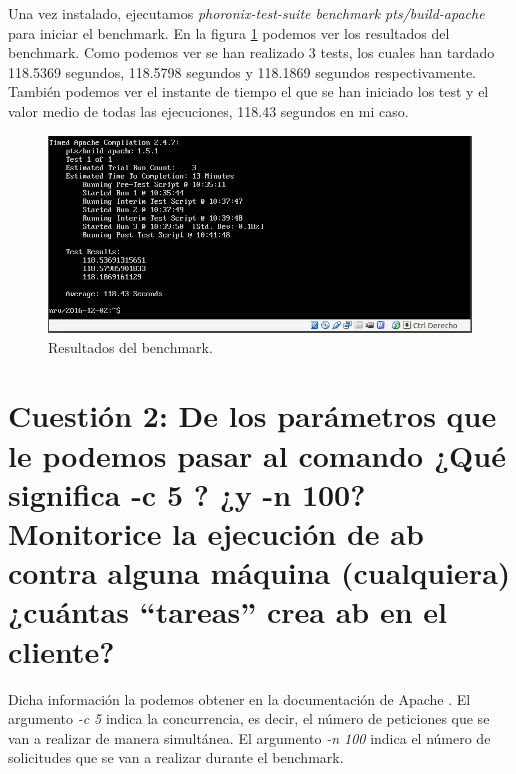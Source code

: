 \documentclass[a4paper,titlepage,12pt]{scrartcl}	%
\numberwithin{figure}{section} %
\numberwithin{table}{section} %
\begin{document}
	Una vez instalado, ejecutamos \textit{phoronix-test-suite benchmark pts/build-apache} para iniciar el benchmark. En la figura \ref{1-5} podemos ver los resultados del benchmark. Como podemos ver se han realizado 3 tests, los cuales han tardado 118.5369 segundos, 118.5798 segundos y 118.1869 segundos respectivamente. También podemos ver el instante de tiempo el que se han iniciado los test y el valor medio de todas las ejecuciones, 118.43 segundos en mi caso.
	
	\begin{figure}[H]
		\includegraphics[width=\linewidth]{./Imagenes/1-5.png}
		\vspace{-0.5cm}
		\caption[Resultados del benchmark.]{Resultados del benchmark.}
		\label{1-5}
	\end{figure}
	
	\section[Cuestión 2: De los parámetros que le podemos pasar al comando ¿Qué significa -c 5 ? ¿y -n 100? Monitorice la ejecución de ab contra alguna máquina (cualquiera) ¿cuántas “tareas” crea ab en el cliente?]{Cuestión 2: De los parámetros que le podemos pasar al comando ¿Qué significa -c 5 ? ¿y -n 100? Monitorice la ejecución de ab contra alguna máquina (cualquiera) ¿cuántas “tareas” crea ab en el cliente?}
	
	Dicha información la podemos obtener en la documentación de Apache \cite{ab-apache}. El argumento \textit{-c 5} indica la concurrencia, es decir, el número de peticiones que se van a realizar de manera simultánea. El argumento \textit{-n 100} indica el número de solicitudes que se van a realizar durante el benchmark. \\
	
\end{document}
